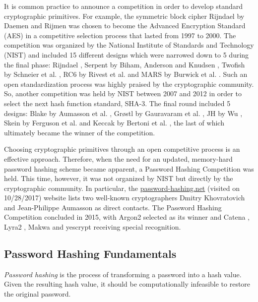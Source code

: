 It is common practice to announce a competition in order to develop standard cryptographic primitives. For example, the symmetric block cipher Rijndael by Daemen and Rijmen \cite{daemen:2002:DRA} was chosen to become the Advanced Encryption Standard (AES) \cite{aes-fips} in a competitive selection process that lasted from 1997 to 2000. The competition was organized by the National Institute of Standards and Technology (NIST) and included 15 different designs which were narrowed down to 5 during the final phase: Rijndael \cite{daemen:2002:DRA}, Serpent by Biham, Anderson and Knudsen \cite{anderson:1988:serpent}, Twofish by Schneier et al. \cite{schneier:1998:twofish}, RC6 by Rivest et al. \cite{rivest:1998:rc6} and MARS by Burwick et al. \cite{burwick:1998:mars}. Such an open standardization process was highly praised by the cryptographic community. So, another competition was held by NIST between 2007 and 2012 in order to select the next hash function standard, SHA-3. The final round included 5 designs: Blake by Aumasson et al. \cite{aumasson:2013:blake2}, Grøstl by Gauravaram et al. \cite{praveen:2011:groestl}, JH by Wu \cite{wu:2011:jh}, Skein by Ferguson et al. \cite{ferguson:2009:skein} and Keccak by Bertoni et al. \cite{cryptoeprint:2015:keccak}, the last of which ultimately became the winner of the competition.

Choosing cryptographic primitives through an open competitive process is an effective approach. Therefore, when the need for an updated, memory-hard password hashing scheme became apparent, a Password Hashing Competition was held. This time, however, it was not organized by NIST but directly by the cryptographic community. In particular, the \url{password-hashing.net} (visited on 10/28/2017) website lists two well-known cryptographers Dmitry Khovratovich and Jean-Philippe Aumasson as direct contacts. The Password Hashing Competition concluded in 2015, with Argon2 \cite{biryukov:2015:argon2} selected as its winner and Catena \cite{forler:2013:catena}, Lyra2 \cite{andrade:2016:lyra2}, Makwa \cite{pornin:2015:makwa} and yescrypt \cite{peslyak:2015:yescrypt} receiving special recognition.

\subsection{Password Hashing Fundamentals}
\label{sec:fundamentals}

\emph{Password hashing} is the process of transforming a password into a hash value. Given the resulting hash value, it should be computationally infeasible to restore the original password.

